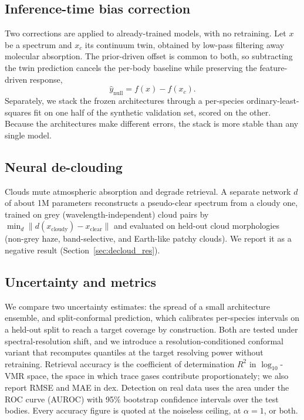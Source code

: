 \documentclass[11pt,twocolumn]{article}
\begin{document}
\subsection{Inference-time bias correction}
\label{sec:corr_method}

Two corrections are applied to already-trained models, with no retraining. Let
$x$ be a spectrum and $x_c$ its continuum twin, obtained by low-pass filtering
away molecular absorption. The prior-driven offset is common to both, so
subtracting the twin prediction cancels the per-body baseline while preserving
the feature-driven response,
\begin{equation}
\hat{y}_\mathrm{null}=f(x)-f(x_c).
\end{equation}
Separately, we stack the frozen architectures through a per-species
ordinary-least-squares fit on one half of the synthetic validation set, scored on
the other. Because the architectures make different errors, the stack is more
stable than any single model.

\subsection{Neural de-clouding}
\label{sec:decloud_method}

Clouds mute atmospheric absorption and degrade retrieval. A separate network $d$
of about 1M parameters reconstructs a pseudo-clear spectrum from a cloudy one,
trained on grey (wavelength-independent) cloud pairs by
$\min_d\lVert d(x_\mathrm{cloudy})-x_\mathrm{clear}\rVert$ and evaluated on
held-out cloud morphologies (non-grey haze, band-selective, and Earth-like
patchy clouds). We report it as a negative result
(Section~\ref{sec:decloud_res}).

\subsection{Uncertainty and metrics}
\label{sec:uq_method}

We compare two uncertainty estimates: the spread of a small architecture
ensemble, and split-conformal prediction, which calibrates per-species intervals
on a held-out split to reach a target coverage by construction. Both are tested
under spectral-resolution shift, and we introduce a resolution-conditioned
conformal variant that recomputes quantiles at the target resolving power without
retraining. Retrieval accuracy is the coefficient of determination $R^2$ in
$\log_{10}$-VMR space, the space in which trace gases contribute proportionately;
we also report RMSE and MAE in dex. Detection on real data uses the area under
the ROC curve (AUROC) with 95\% bootstrap confidence intervals over the test
bodies. Every accuracy figure is quoted at the noiseless ceiling, at
$\alpha{=}1$, or both.
\end{document}
